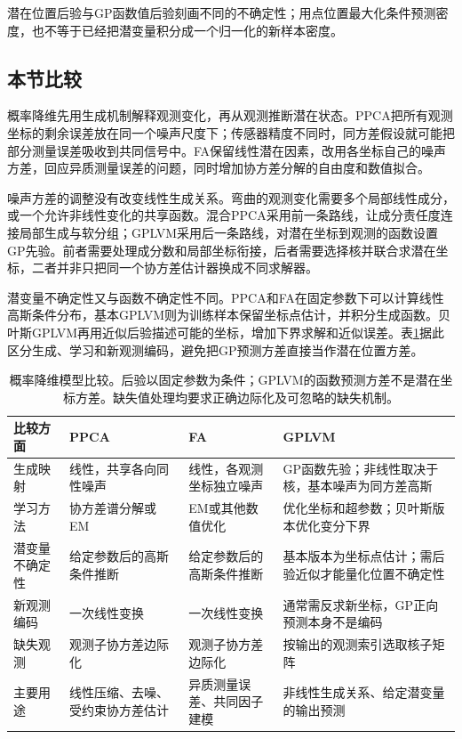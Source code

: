 潜在位置后验与GP函数值后验刻画不同的不确定性；用点位置最大化条件预测密度，也不等于已经把潜变量积分成一个归一化的新样本密度。

\subsection{本节比较}
\label{sec:dim-probabilistic-comparison}

概率降维先用生成机制解释观测变化，再从观测推断潜在状态。PPCA把所有观测坐标的剩余误差放在同一个噪声尺度下；传感器精度不同时，同方差假设就可能把部分测量误差吸收到共同信号中。FA保留线性潜在因素，改用各坐标自己的噪声方差，回应异质测量误差的问题，同时增加协方差分解的自由度和数值拟合。

噪声方差的调整没有改变线性生成关系。弯曲的观测变化需要多个局部线性成分，或一个允许非线性变化的共享函数。混合PPCA采用前一条路线，让成分责任度连接局部生成与软分组；GPLVM采用后一条路线，对潜在坐标到观测的函数设置GP先验。前者需要处理成分数和局部坐标衔接，后者需要选择核并联合求潜在坐标，二者并非只把同一个协方差估计器换成不同求解器。

潜变量不确定性又与函数不确定性不同。PPCA和FA在固定参数下可以计算线性高斯条件分布，基本GPLVM则为训练样本保留坐标点估计，并积分生成函数。贝叶斯GPLVM再用近似后验描述可能的坐标，增加下界求解和近似误差。表\ref{tab:dim-probabilistic-comparison}据此区分生成、学习和新观测编码，避免把GP预测方差直接当作潜在位置方差。

\begin{table}[htbp]
\centering
\small
\begin{tabularx}{\linewidth}{@{}>{\RaggedRight\arraybackslash}p{20mm}>{\RaggedRight\arraybackslash}X>{\RaggedRight\arraybackslash}X>{\RaggedRight\arraybackslash}X@{}}
\toprule
比较方面 & PPCA & FA & GPLVM \\
\midrule
生成映射 & 线性，共享各向同性噪声 & 线性，各观测坐标独立噪声 & GP函数先验；非线性取决于核，基本噪声为同方差高斯 \\
学习方法 & 协方差谱分解或EM & EM或其他数值优化 & 优化坐标和超参数；贝叶斯版本优化变分下界 \\
潜变量不确定性 & 给定参数后的高斯条件推断 & 给定参数后的高斯条件推断 & 基本版本为坐标点估计；需后验近似才能量化位置不确定性 \\
新观测编码 & 一次线性变换 & 一次线性变换 & 通常需反求新坐标，GP正向预测本身不是编码 \\
缺失观测 & 观测子协方差边际化 & 观测子协方差边际化 & 按输出的观测索引选取核子矩阵 \\
主要用途 & 线性压缩、去噪、受约束协方差估计 & 异质测量误差、共同因子建模 & 非线性生成关系、给定潜变量的输出预测 \\
\bottomrule
\end{tabularx}
\caption{概率降维模型比较。后验以固定参数为条件；GPLVM的函数预测方差不是潜在坐标方差。缺失值处理均要求正确边际化及可忽略的缺失机制。}
\label{tab:dim-probabilistic-comparison}
\end{table}


